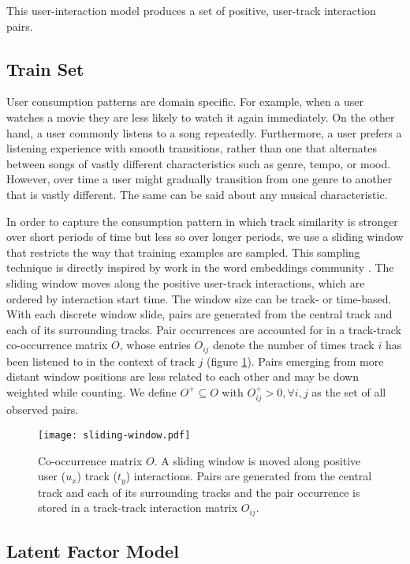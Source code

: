 \documentclass[twocolumn]{article}
\begin{document}
This user-interaction model produces a set of positive, user-track interaction pairs.

\subsection{Train Set} \label{train-set}
User consumption patterns are domain specific. For example, when a user watches a movie they are less likely to watch it again immediately. On the other hand, a user commonly listens to a song repeatedly. Furthermore, a user prefers a listening experience with smooth transitions, rather than one that alternates between songs of vastly different characteristics such as genre, tempo, or mood. However, over time a user might gradually transition from one genre to another that is vastly different. The same can be said about any musical characteristic.

In order to capture the consumption pattern in which track similarity is stronger over short periods of time but less so over longer periods, we use a sliding window that restricts the way that training examples are sampled. This sampling technique is directly inspired by work in the word embeddings community \cite{word2vec, glove, swivel}. The sliding window moves along the positive user-track interactions, which are ordered by interaction start time. The window size can be track- or time-based. With each discrete window slide, pairs are generated from the central track and each of its surrounding tracks. Pair occurrences are accounted for in a track-track co-occurrence matrix $O$, whose entries $O_{ij}$ denote the number of times track $i$ has been listened to in the context of track $j$ (figure \ref{fig:sliding-window}). Pairs emerging from more distant window positions are less related to each other and may be down weighted while counting. We define $O^+ \subseteq O$ with $O^+_{ij} > 0, \forall i,j$ as the set of all observed pairs.

\begin{figure}[t]
  \centering
  \texttt{[image: sliding-window.pdf]}
  \caption{Co-occurrence matrix $O$. A sliding window is moved along positive user ($u_x$) track ($t_y$) interactions. Pairs are generated from the central track and each of its surrounding tracks and the pair occurrence is stored in a track-track interaction matrix $O_{ij}$.}
  \label{fig:sliding-window}
\end{figure}

\subsection{Latent Factor Model}
\end{document}
